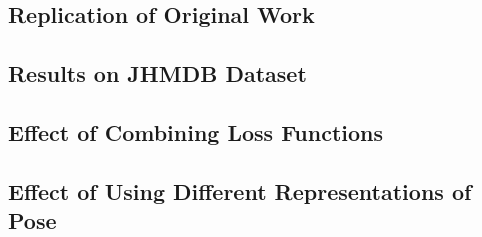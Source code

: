 \subsection{Replication of Original Work}
\label{sec:exp-replication}

\subsection{Results on JHMDB Dataset}

\subsection{Effect of Combining Loss Functions}

\subsection{Effect of Using Different Representations of Pose}
\label{sec:different_pose_representation_experiment}

